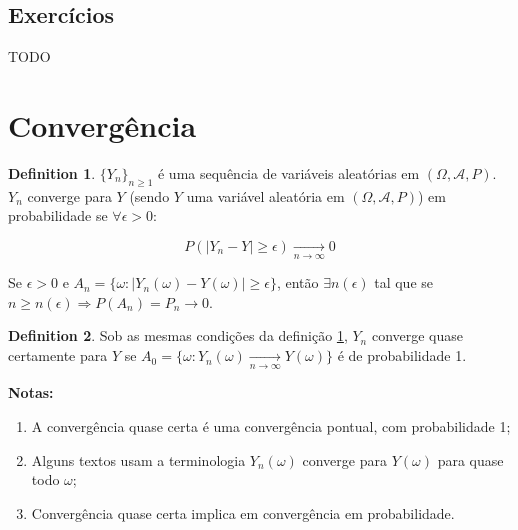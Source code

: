 \documentclass[
]{article}
\providecommand{\tightlist}{%
  \setlength{\itemsep}{0pt}\setlength{\parskip}{0pt}}
\theoremstyle{definition}
\newtheorem{definition}{Definition}[section]
\theoremstyle{definition}
\theoremstyle{definition}
\theoremstyle{definition}
\theoremstyle{remark}
\begin{document}
\newpage

\hypertarget{exercuxedcios-3}{%
\subsection{Exercícios}\label{exercuxedcios-3}}

TODO

\newpage

\hypertarget{converguxeancia-1}{%
\section{Convergência}\label{converguxeancia-1}}

\begin{definition}
\protect\hypertarget{def:convprob}{}\label{def:convprob}\(\{Y_{n}\}_{n \ge 1}\) é uma sequência de variáveis aleatórias em \((\Omega, \mathcal{A}, P)\). \(Y_{n}\) converge para \(Y\) (sendo \(Y\) uma variável aleatória em \((\Omega, \mathcal{A}, P)\)) em probabilidade se \(\forall \epsilon > 0\):

\begin{equation*}
P(|Y_{n} - Y| \ge \epsilon) \xrightarrow[n \to \infty]{}0
\end{equation*}
\end{definition}

Se \(\epsilon > 0\) e \(A_{n} = \{\omega: |Y_{n}(\omega) - Y(\omega)| \ge \epsilon\}\), então \(\exists n(\epsilon)\) tal que se \(n \ge n(\epsilon) \Rightarrow P(A_{n}) = P_{n} \to 0\).

\begin{definition}
\protect\hypertarget{def:convqc}{}\label{def:convqc}Sob as mesmas condições da definição \ref{def:convprob}, \(Y_{n}\) converge quase certamente para \(Y\) se \(A_{0} = \{\omega : Y_{n}(\omega) \xrightarrow[n \to \infty]{}Y(\omega)\}\) é de probabilidade 1.
\end{definition}

\textbf{Notas:}

\begin{enumerate}
\def\labelenumi{\arabic{enumi}.}
\tightlist
\item
  A convergência quase certa é uma convergência pontual, com probabilidade 1;
\item
  Alguns textos usam a terminologia \(Y_{n}(\omega)\) converge para \(Y(\omega)\) para quase todo \(\omega\);
\item
  Convergência quase certa implica em convergência em probabilidade.
\end{enumerate}
\end{document}
